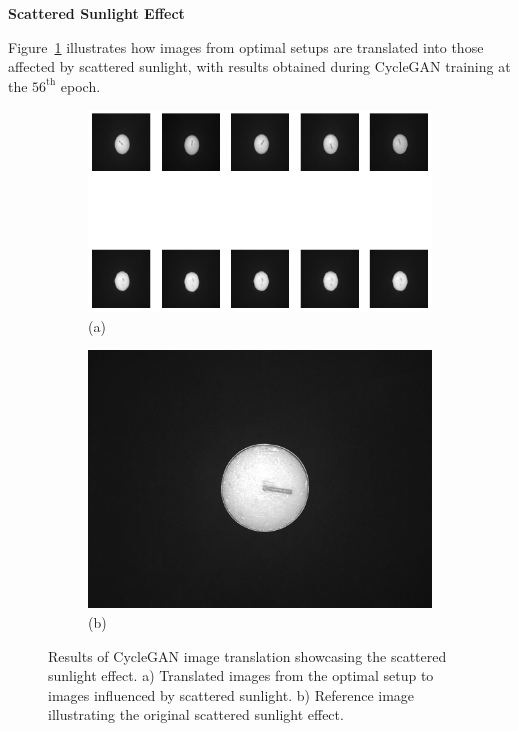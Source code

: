 \documentclass[12pt,DIV14,BCOR12mm,a4paper,footinclude=false,headinclude,parskip=half-,twoside,openright,cleardoublepage=empty,toc=index,bibliography=totoc,listof=totoc]{scrreprt}
\numberwithin{equation}{chapter}
\begin{document}
\textbf{Scattered Sunlight Effect}

Figure~\ref{fig:scattered_sunlight_result} illustrates how images from optimal setups are translated into those affected by scattered sunlight, with results obtained during CycleGAN training at the \( 56^{\text{th}} \) epoch. 

\begin{figure}
    \centering
    \begin{subfigure}[b]{1.0\textwidth}
        \centering
        \includegraphics[width=\textwidth]{../media/candles_sunlight.png}
        \caption*{(a)}
    \end{subfigure}
    \hfill
    \begin{subfigure}[b]{0.25\textwidth}
        \centering
        \includegraphics[width=\textwidth]{../media/candles_sunlight_real.png}
        \caption*{(b)}
    \end{subfigure}
    \caption{Results of CycleGAN image translation showcasing the scattered sunlight effect. a) Translated images from the optimal setup to images influenced by scattered sunlight. b) Reference image illustrating the original scattered sunlight effect.}
    \label{fig:scattered_sunlight_result}
\end{figure}
\end{document}
